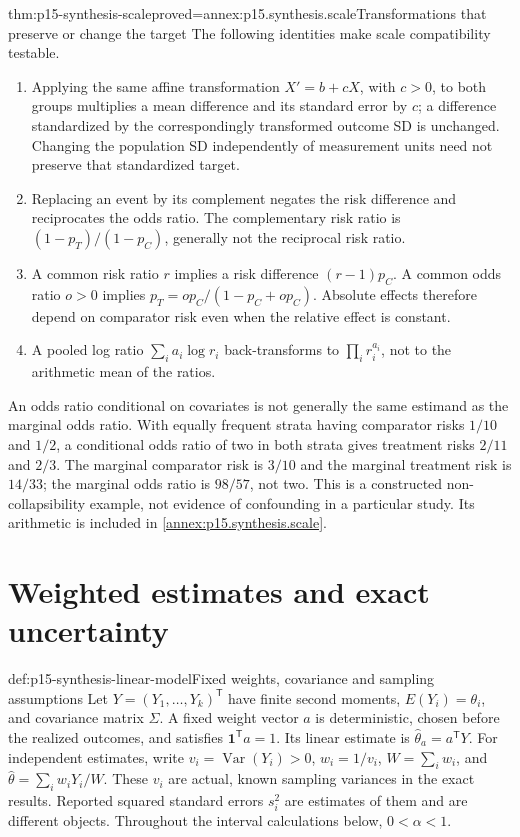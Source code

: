 \begin{hbtheorem}{thm:p15-synthesis-scale}{proved=annex:p15.synthesis.scale}{Transformations that preserve or change the target}
The following identities make scale compatibility testable.
\begin{enumerate}
\item Applying the same affine transformation \(X'=b+cX\), with
      \(c>0\), to both groups multiplies a mean difference and its
      standard error by \(c\); a difference standardized by the correspondingly
      transformed outcome SD is unchanged. Changing the population SD
      independently of measurement units need not preserve that standardized target.
\item Replacing an event by its complement negates the risk difference and
      reciprocates the odds ratio. The complementary risk ratio is
      \((1-p_T)/(1-p_C)\), generally not the reciprocal risk ratio.
\item A common risk ratio \(r\) implies a risk difference
      \((r-1)p_C\). A common odds ratio \(o>0\) implies
      \(p_T=op_C/(1-p_C+op_C)\). Absolute effects therefore depend on
      comparator risk even when the relative effect is constant.
\item A pooled log ratio \(\sum_i a_i\log r_i\) back-transforms to
      \(\prod_i r_i^{a_i}\), not to the arithmetic mean of the ratios.
\end{enumerate}
\end{hbtheorem}

An odds ratio conditional on covariates is not generally the same estimand as
the marginal odds ratio. With equally frequent strata having comparator risks
\(1/10\) and \(1/2\), a conditional odds ratio of two in both strata
gives treatment risks \(2/11\) and \(2/3\). The marginal comparator
risk is \(3/10\) and the marginal treatment risk is \(14/33\); the
marginal odds ratio is \(98/57\), not two. This is a constructed
non-collapsibility example, not evidence of confounding in a particular study.
Its arithmetic is included in \ref{annex:p15.synthesis.scale}.

\section{Weighted estimates and exact uncertainty}
\label{sec:p15-synthesis-weights}

\begin{hbdefinition}{def:p15-synthesis-linear-model}{Fixed weights, covariance and sampling assumptions}
Let \(Y=(Y_1,\ldots,Y_k)^{\mathsf T}\) have finite second moments,
\(E(Y_i)=\theta_i\), and covariance matrix \(\Sigma\). A fixed
weight vector \(a\) is deterministic, chosen before the realized outcomes, and
satisfies \(\mathbf1^{\mathsf T}a=1\). Its linear estimate is
\(\widehat\theta_a=a^{\mathsf T}Y\). For independent estimates,
write \(v_i=\operatorname{Var}(Y_i)>0\),
\(w_i=1/v_i\), \(W=\sum_i w_i\), and
\(\widehat\theta=\sum_iw_iY_i/W\). These \(v_i\) are actual,
known sampling variances in the exact results. Reported squared standard
errors \(s_i^2\) are estimates of them and are different objects.
Throughout the interval calculations below, \(0<\alpha<1\).
\end{hbdefinition}

